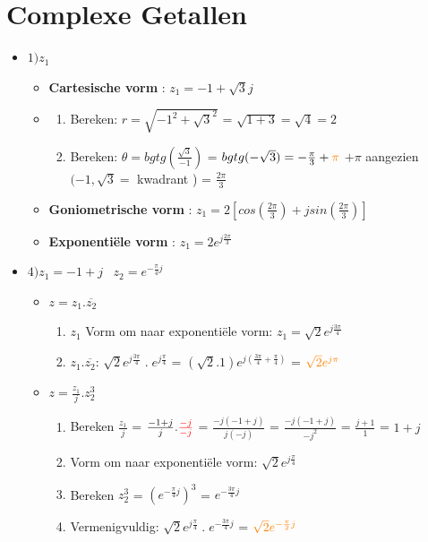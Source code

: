 \documentclass[12pt]{report}
\newcommand{\important}[1] {\textbf{\color{orange}#1}}
\newcommand{\mathimportant}[2] {\textbf{\color{#2}$#1$}}
\begin{document}
\chapter{Complexe Getallen}
  \begin{itemize}
   \item $1)z_1$
   \begin{itemize}
     \item \important{Cartesische vorm} : $z_1 = -1 + \sqrt{3}j$
     \item \begin{enumerate}
            \item Bereken: $r = \sqrt{-1^2 + \sqrt{3}^2}$
			    = $\sqrt{1 + 3} = \sqrt{4} = 2$
	    \item Bereken: $\theta = bgtg(\frac{\sqrt{3}}{-1})$
			    = $bgtg(-\sqrt{3}) = -\frac{\pi}{3} + \mathimportant{\pi}{orange}$
			    \newline
			    $+\pi$ aangezien $(-1, \sqrt{3} =$ 
			    kwadrant \textup{\uppercase\expandafter{}})
			    = $\frac{2\pi}{3}$
           \end{enumerate}
     \item \important{Goniometrische vorm} : $z_1 = 2[cos(\frac{2\pi}{3}) + jsin(\frac{2\pi}{3})]$
     \item \important{Exponentiële vorm} : $z_1 = 2e^{j\frac{2\pi}{3}}$

    \end{itemize}
   \item $4)z_1 = - 1 + j\;\;\;z_2 = e^{-\frac{\pi}{4}j}$
   \begin{itemize}
    \item $z = z_1.\overline{z_2}$
     \begin{enumerate}
           \item $z_1$ Vorm om naar exponentiële vorm: $z_1 = \sqrt{2}e^{j\frac{3\pi}{4}}$
           \item $z_1 . \overline{z_2}$: $\sqrt{2}e^{j\frac{3\pi}{4}}\;.\;e^{j\frac{\pi}{4}}$
            = $(\sqrt{2} . 1)e^{j(\frac{3\pi}{4} + \frac{\pi}{4})}$ = $\mathimportant{\sqrt{2}e^{j\pi}}{orange}$
          \end{enumerate}
    \item $z = \frac{z_1}{j} . z^{3}_2$
      \begin{enumerate}
       \item Bereken $\frac{z_1}{j}$ = $\frac{-1 + j}{j} . \mathimportant{\frac{-j}{-j}}{red}$ = $\frac{-j(-1 + j)}{j(-j)}$
	= $\frac{-j(-1 + j)}{-j^2}$ = $\frac{j + 1}{1}$ = $1 + j$
	\item Vorm om naar exponentiële vorm: $\sqrt{2}e^{j\frac{\pi}{4}}$
	\item Bereken $z^{3}_2$ = $(e^{-\frac{\pi}{4}j})^3$ = $e^{-\frac{3\pi}{4}j}$
	\item Vermenigvuldig: $\sqrt{2}e^{j\frac{\pi}{4}}\;.\;e^{-\frac{3\pi}{4}j}$
	= $\mathimportant{\sqrt{2}e^{-\frac{\pi}{2}j}}{orange}$


\end{enumerate}
\end{itemize}
\end{itemize}
\end{document}

